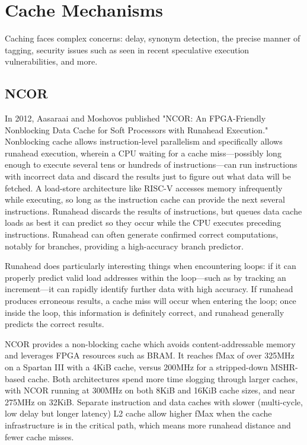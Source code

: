 \chapter{Cache Mechanisms}

Caching faces complex concerns:  delay, synonym detection, the precise manner
of tagging, security issues such as seen in recent speculative execution
vulnerabilities, and more.

\section{NCOR}

In 2012, Aasaraai and Moshovos published "NCOR:  An FPGA-Friendly Nonblocking
Data Cache for Soft Processors with Runahead Execution."  Nonblocking cache
allows instruction-level parallelism and specifically allows runahead
execution, wherein a CPU waiting for a cache miss—possibly long enough to
execute several tens or hundreds of instructions—can run instructions with
incorrect data and discard the results just to figure out what data will be
fetched.  A load-store architecture like RISC-V accesses memory infrequently
while executing, so long as the instruction cache can provide the next several
instructions.  Runahead discards the results of instructions, but queues data
cache loads as best it can predict so they occur while the CPU executes
preceding instructions.  Runahead can often generate confirmed correct
computations, notably for branches, providing a high-accuracy branch predictor.

Runahead does particularly interesting things when encountering loops:  if it
can properly predict valid load addresses within the loop—such as by tracking
an increment—it can rapidly identify further data with high accuracy.  If
runahead produces erroneous results, a cache miss will occur when entering the
loop; once inside the loop, this information is definitely correct, and
runahead generally predicts the correct results.

NCOR provides a non-blocking cache which avoids content-addressable memory and
leverages FPGA resources such as BRAM.  It reaches fMax of over 325MHz on a
Spartan III with a 4KiB cache, versus 200MHz for a stripped-down MSHR-based
cache.  Both architectures spend more time slogging through larger caches, with
NCOR running at 300MHz on both 8KiB and 16KiB cache sizes, and near 275MHz on
32KiB.  Separate instruction and data caches with slower (multi-cycle, low
delay but longer latency) L2 cache allow higher fMax when the cache
infrastructure is in the critical path, which means more runahead distance and
fewer cache misses.

